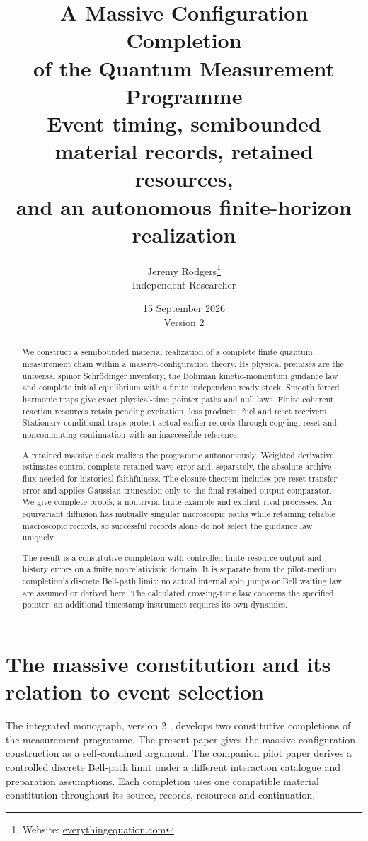 \documentclass[11pt]{article}
\title{%
  \bfseries A Massive Configuration Completion\\
  of the Quantum Measurement Programme\\[6mm]
  {\large Event timing, semibounded material records, retained resources,\\
  and an autonomous finite-horizon realization}
}
\author{%
  Jeremy Rodgers\thanks{Website:
  \href{https://everythingequation.com}{everythingequation.com}}\\
  \small Independent Researcher
}
\date{%
  15 September 2026\\[2mm]
  \small Version 2
}
\theoremstyle{definition}\newtheorem{assumption}[theorem]{Constitutive assumption}
\theoremstyle{remark}\newtheorem{remark}[theorem]{Remark}
\begin{document}
\maketitle
\begin{abstract}
We construct a semibounded material realization of a complete finite quantum measurement chain within a massive-configuration theory. Its physical premises are the universal spinor Schr\"odinger inventory, the Bohmian kinetic-momentum guidance law and complete initial equilibrium with a finite independent ready stock. Smooth forced harmonic traps give exact physical-time pointer paths and null laws. Finite coherent reaction resources retain pending excitation, loss products, fuel and reset receivers. Stationary conditional traps protect actual earlier records through copying, reset and noncommuting continuation with an inaccessible reference.

A retained massive clock realizes the programme autonomously. Weighted derivative estimates control complete retained-wave error and, separately, the absolute archive flux needed for historical faithfulness. The closure theorem includes pre-reset transfer error and applies Gaussian truncation only to the final retained-output comparator. We give complete proofs, a nontrivial finite example and explicit rival processes. An equivariant diffusion has mutually singular microscopic paths while retaining reliable macroscopic records, so successful records alone do not select the guidance law uniquely.

The result is a constitutive completion with controlled finite-resource output and history errors on a finite nonrelativistic domain. It is separate from the pilot-medium completion's discrete Bell-path limit: no actual internal spin jumps or Bell waiting law are assumed or derived here. The calculated crossing-time law concerns the specified pointer; an additional timestamp instrument requires its own dynamics.

\end{abstract}
\tableofcontents
\newpage

\section{The massive constitution and its relation to event selection}
\label{sec:frontier}
The integrated monograph, version 2 \cite{Monograph}, develops two constitutive completions of the measurement programme. The present paper gives the massive-configuration construction as a self-contained argument. The companion pilot paper \cite{Pilot} derives a controlled discrete Bell-path limit under a different interaction catalogue and preparation assumptions. Each completion uses one compatible material constitution throughout its source, records, resources and continuation.
\end{document}
